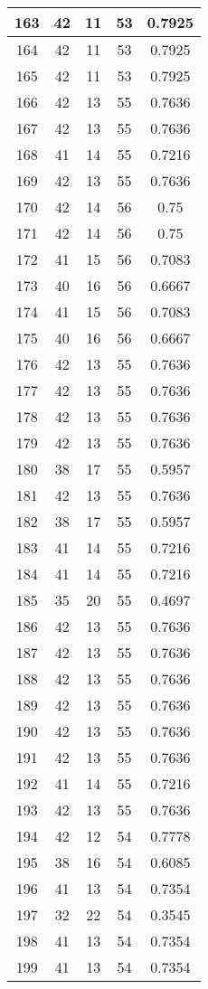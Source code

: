\documentclass[letterpaper, 12pt]{article}
\begin{document}
\begin{longtable}{|c|c|c|c|c|}
\hline
163 & 42 & 11 & 53 & 0.7925 \\
\hline
164 & 42 & 11 & 53 & 0.7925 \\
\hline
165 & 42 & 11 & 53 & 0.7925 \\
\hline
166 & 42 & 13 & 55 & 0.7636 \\
\hline
167 & 42 & 13 & 55 & 0.7636 \\
\hline
168 & 41 & 14 & 55 & 0.7216 \\
\hline
169 & 42 & 13 & 55 & 0.7636 \\
\hline
170 & 42 & 14 & 56 & 0.75 \\
\hline
171 & 42 & 14 & 56 & 0.75 \\
\hline
172 & 41 & 15 & 56 & 0.7083 \\
\hline
173 & 40 & 16 & 56 & 0.6667 \\
\hline
174 & 41 & 15 & 56 & 0.7083 \\
\hline
175 & 40 & 16 & 56 & 0.6667 \\
\hline
176 & 42 & 13 & 55 & 0.7636 \\
\hline
177 & 42 & 13 & 55 & 0.7636 \\
\hline
178 & 42 & 13 & 55 & 0.7636 \\
\hline
179 & 42 & 13 & 55 & 0.7636 \\
\hline
180 & 38 & 17 & 55 & 0.5957 \\
\hline
181 & 42 & 13 & 55 & 0.7636 \\
\hline
182 & 38 & 17 & 55 & 0.5957 \\
\hline
183 & 41 & 14 & 55 & 0.7216 \\
\hline
184 & 41 & 14 & 55 & 0.7216 \\
\hline
185 & 35 & 20 & 55 & 0.4697 \\
\hline
186 & 42 & 13 & 55 & 0.7636 \\
\hline
187 & 42 & 13 & 55 & 0.7636 \\
\hline
188 & 42 & 13 & 55 & 0.7636 \\
\hline
189 & 42 & 13 & 55 & 0.7636 \\
\hline
190 & 42 & 13 & 55 & 0.7636 \\
\hline
191 & 42 & 13 & 55 & 0.7636 \\
\hline
192 & 41 & 14 & 55 & 0.7216 \\
\hline
193 & 42 & 13 & 55 & 0.7636 \\
\hline
194 & 42 & 12 & 54 & 0.7778 \\
\hline
195 & 38 & 16 & 54 & 0.6085 \\
\hline
196 & 41 & 13 & 54 & 0.7354 \\
\hline
197 & 32 & 22 & 54 & 0.3545 \\
\hline
198 & 41 & 13 & 54 & 0.7354 \\
\hline
199 & 41 & 13 & 54 & 0.7354 \\
\hline
\end{longtable}
\end{document}
